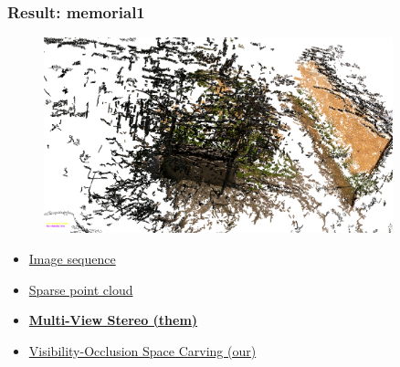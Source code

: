 \documentclass{beamer}
\begin{document}
\begin{frame}
  \frametitle{Result: memorial1}
  \begin{figure}[htb!]
   \centering
   \includegraphics[width=0.9\textwidth]{img/memorial_dense}  %
  \end{figure}
  \begin{itemize}
    \item \href{run:./vid/09-result3-seq.mp4}{Image sequence} \\
    \item \href{run:./vid/10-result3-sparse.mp4}{Sparse point cloud} \\
    \item \href{run:./vid/11-result3-mvs.mp4}{\textbf{Multi-View Stereo (them)}} \\
    \item \href{run:./vid/12-result3-visocc.mp4}{Visibility-Occlusion Space Carving (our)} \\
  \end{itemize}
\end{frame}
\end{document}
